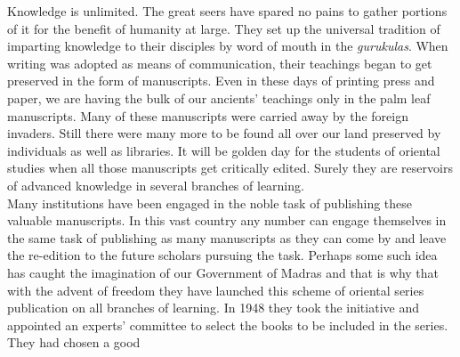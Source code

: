 \documentclass[11pt, openany]{book}
\begin{document}
\vspace{0.5cm}
{\englishfont Knowledge is unlimited. The great seers have 
spared no pains to gather portions of it for the benefit of
humanity at large. They set up the universal tradition
of imparting knowledge to their disciples by word of
mouth in the \textit{gurukulas}. When writing was adopted as
means of communication, their teachings began to get
preserved in the form of manuscripts. Even in these
days of printing press and paper, we are having the bulk
of our ancients' teachings only in the palm leaf manuscripts. Many of these manuscripts were carried away
by the foreign invaders. Still there were many more to
be found all over our land preserved by individuals as
well as libraries. It will be golden day for the students of oriental studies when all those manuscripts
get critically edited. Surely they are reservoirs of
advanced knowledge in several branches of learning.\\

\vspace{-3mm}
 Many institutions have been engaged in the noble 
task of publishing these valuable manuscripts. In this 
vast country any number can engage themselves in the
same task of publishing as many manuscripts as they can
come by and leave the re-edition to the future scholars
pursuing the task. Perhaps some such idea has caught
the imagination of our Government of Madras and that
is why that with the advent of freedom they have
launched this scheme of oriental series publication on all
branches of learning. In 1948 they took the initiative 
and appointed an experts' committee to select the books
to be included in the series. They had chosen a good}
\thispagestyle{empty}
\newpage
\setcounter{page}{2}
\end{document}
